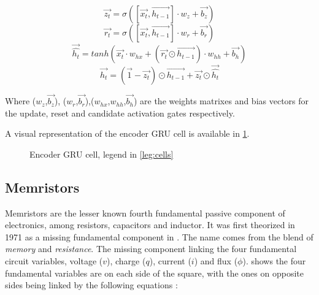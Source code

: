 \begin{equation}\label{eq:updateG}
  \overrightarrow{z_t}=\sigma ([\overrightarrow{x_t},\overrightarrow{h_{t-1}}] \cdot w_z + \overrightarrow{b_z})
\end{equation}
\begin{equation}\label{eq:resetG}
  \overrightarrow{r_t}=\sigma ([\overrightarrow{x_t},\overrightarrow{h_{t-1}}] \cdot w_r + \overrightarrow{b_r})
\end{equation}
\begin{equation}\label{eq:candActivG}
  \overrightarrow{\hat{h_t}}=tanh(\overrightarrow{x_t}\cdot w_{hx}+(\overrightarrow{r_t}\odot\overrightarrow{h_{t-1}}) \cdot w_{hh} + \overrightarrow{b_h})
\end{equation}
\begin{equation}\label{eq:gruHidG}
  \overrightarrow{h_t}=(\overrightarrow{1}-\overrightarrow{z_t})\odot \overrightarrow{h_{t-1}} + \overrightarrow{z_t}\odot \overrightarrow{\hat{h_t}}
\end{equation}

Where ($w_z$,$\overrightarrow{b_z}$), ($w_r$,$\overrightarrow{b_r}$),($w_{hx}$,$w_{hh}$,$\overrightarrow{b_h}$) are the weights matrixes and bias vectors for the update, reset and candidate activation gates respectively.

A visual representation of the encoder \ac{GRU} cell is available in \cref{fig:encoderGruCell}.

\begin{figure}[t]
  \centering
  
  \caption{Encoder \acs{GRU} cell, legend in \cref{leg:cells}\label{fig:encoderGruCell}}
\end{figure}

\subsection{Memristors}

Memristors are the lesser known fourth fundamental passive component of electronics, among resistors, capacitors and inductor.
It was first theorized in 1971 as a missing fundamental component in \cite{TheoMemristor}. The name comes from the blend of \textit{memory} and \textit{resistance}.
The missing component linking the four fundamental circuit variables, voltage ($v$), charge ($q$), current ($i$) and flux ($\phi$).  shows the four fundamental variables are on each side of the square, with the ones on opposite sides being linked by the following equations :

